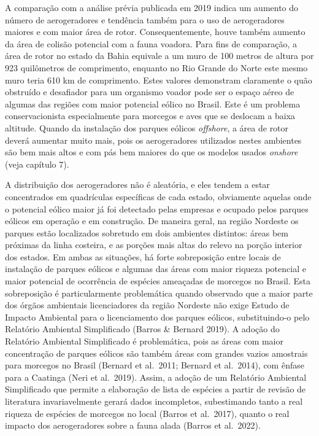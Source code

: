 \documentclass[
  oneside]{scrbook}
\begin{document}
A comparação com a análise prévia publicada em 2019 indica um aumento do número de aerogeradores e tendência também para o uso de aerogeradores maiores e com maior área de rotor. Consequentemente, houve também aumento da área de colisão potencial com a fauna voadora. Para fins de comparação, a área de rotor no estado da Bahia equivale a um muro de 100 metros de altura por 923 quilômetros de comprimento, enquanto no Rio Grande do Norte este mesmo muro teria 610 km de comprimento. Estes valores demonstram claramente o quão obstruído e desafiador para um organismo voador pode ser o espaço aéreo de algumas das regiões com maior potencial eólico no Brasil. Este é um problema conservacionista especialmente para morcegos e aves que se deslocam a baixa altitude. Quando da instalação dos parques eólicos \emph{offshore}, a área de rotor deverá aumentar muito mais, pois os aerogeradores utilizados nestes ambientes são bem mais altos e com pás bem maiores do que os modelos usados \emph{onshore} (veja capítulo 7).

A distribuição dos aerogeradores não é aleatória, e eles tendem a estar concentrados em quadrículas específicas de cada estado, obviamente aquelas onde o potencial eólico maior já foi detectado pelas empresas e ocupado pelos parques eólicos em operação e em construção. De maneira geral, na região Nordeste os parques estão localizados sobretudo em dois ambientes distintos: áreas bem próximas da linha costeira, e as porções mais altas do relevo na porção interior dos estados. Em ambas as situações, há forte sobreposição entre locais de instalação de parques eólicos e algumas das áreas com maior riqueza potencial e maior potencial de ocorrência de espécies ameaçadas de morcegos no Brasil. Esta sobreposição é particularmente problemática quando observado que a maior parte dos órgãos ambientais licenciadores da região Nordeste não exige Estudo de Impacto Ambiental para o licenciamento dos parques eólicos, substituindo-o pelo Relatório Ambiental Simplificado (Barros \& Bernard 2019). A adoção do Relatório Ambiental Simplificado é problemática, pois as áreas com maior concentração de parques eólicos são também áreas com grandes vazios amostrais para morcegos no Brasil (Bernard et al.~2011; Bernard et al.~2014), com ênfase para a Caatinga (Neri et al.~2019). Assim, a adoção de um Relatório Ambiental Simplificado que permite a elaboração de lista de espécies a partir de revisão de literatura invariavelmente gerará dados incompletos, subestimando tanto a real riqueza de espécies de morcegos no local (Barros et al.~2017), quanto o real impacto dos aerogeradores sobre a fauna alada (Barros et al.~2022).
\end{document}
